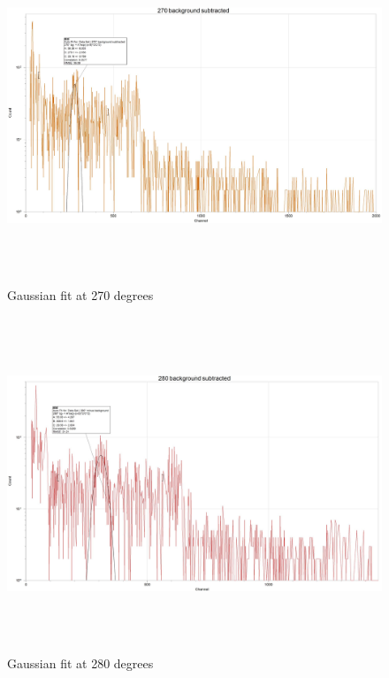 \documentclass[fleqn]{article}
\begin{document}
  \pagebreak

  \begin{figure}[htbp]
    \includegraphics[height=10cm, width=18cm]{Four.JPG}
    \caption{
      Gaussian fit at 270 degrees
    }
  \end{figure}

  \pagebreak

  \begin{figure}[htbp]
    \includegraphics[height=10cm, width=18cm]{Five.JPG}
    \caption{
      Gaussian fit at 280 degrees
    }
  \end{figure}

  \pagebreak
\end{document}
